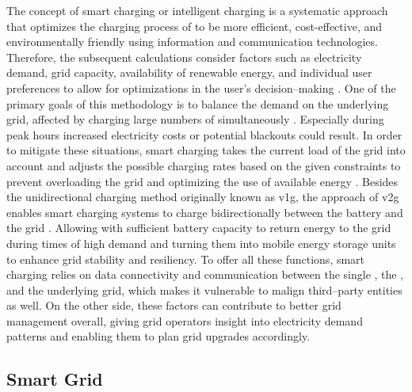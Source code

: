 The concept of smart charging or intelligent charging is a systematic approach that optimizes the charging process of  to be more efficient, cost-effective, and environmentally friendly using information and communication technologies. 
Therefore, the subsequent calculations consider factors such as electricity demand, grid capacity, availability of renewable energy, and individual user preferences to allow for optimizations in the user's decision--making \cite{deb_smart_2022}.
One of the primary goals of this methodology is to balance the demand on the underlying grid, affected by charging large numbers of  simultaneously \cite{daina_electric_2017}. Especially during peak hours increased electricity costs or potential blackouts could result. 
In order to mitigate these situations, smart charging takes the current load of the grid into account and adjusts the possible charging rates based on the given constraints to prevent overloading the grid and optimizing the use of available energy \cite{garcia-villalobos_plug-electric_2014}. 
Besides the unidirectional charging method originally known as \acrfull{v1g}, the approach of \acrfull{v2g} enables smart charging systems to charge bidirectionally between the  battery and the grid \cite[199]{kathiresh_e-mobility_2022}. Allowing  with sufficient battery capacity to return energy to the grid during times of high demand and turning them into mobile energy storage units to enhance grid stability and resiliency.
To offer all these functions, smart charging relies on data connectivity and communication between the single , the , and the underlying grid, which makes it vulnerable to malign third--party entities as well. On the other side, these factors can contribute to better grid management overall, giving grid operators insight into electricity demand patterns and enabling them to plan grid upgrades accordingly.

\subsection{Smart Grid}
\label{ch:Fundamentals:sec:Electric Mobility:ssec:Smart Grid}

